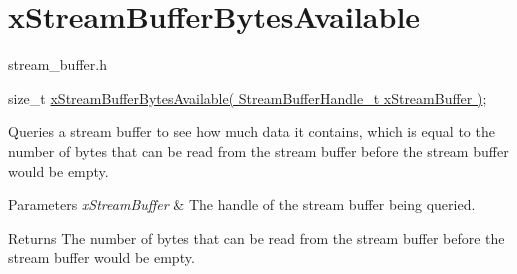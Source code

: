 \hypertarget{group__xStreamBufferBytesAvailable}{}\section{x\+Stream\+Buffer\+Bytes\+Available}
\label{group__xStreamBufferBytesAvailable}
stream\+\_\+buffer.\+h


\begin{DoxyPre}
size\_t \hyperlink{stream__buffer_8h_af32d1737de29f24ee31ac1e3c407d9fd}{xStreamBufferBytesAvailable( StreamBufferHandle\_t xStreamBuffer )};
\end{DoxyPre}


Queries a stream buffer to see how much data it contains, which is equal to the number of bytes that can be read from the stream buffer before the stream buffer would be empty.


\begin{DoxyParams}{Parameters}
{\em x\+Stream\+Buffer} & The handle of the stream buffer being queried.\\
\hline
\end{DoxyParams}
\begin{DoxyReturn}{Returns}
The number of bytes that can be read from the stream buffer before the stream buffer would be empty. 
\end{DoxyReturn}
